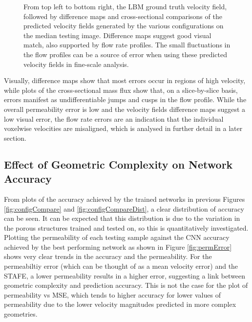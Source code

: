 \documentclass{article}
\begin{document}
\begin{figure}[htp!]
\begin{minipage}[b]{0.32\textwidth}
  \end{minipage}
  \vspace{5mm}
    \caption{From top left to bottom right, the LBM ground truth velocity field, followed by difference maps and cross-sectional comparisons of the predicted velocity fields generated by the various configurations on the median testing image. Difference maps suggest good visual match, also supported by flow rate profiles. The small fluctuations in the flow profiles can be a source of error when using these predicted velocity fields in fine-scale analysis.}
    \label{fig:velComparemedian}
\end{figure}

Visually, difference maps show that most errors occur in regions of high velocity, while plots of the cross-sectional mass flux show that, on a slice-by-slice basis, errors manifest as undifferentiable jumps and cusps in the flow profile. While the overall permeability error is low and the velocity fields difference maps suggest a low visual error, the flow rate errors are an indication that the individual voxelwise velocities are misaligned, which is analysed in further detail in a later section. 

\subsection{Effect of Geometric Complexity on Network Accuracy}
\label{sec:complexAccuracy}

From plots of the accuracy achieved by the trained networks in previous Figures \ref{fig:configCompare} and \ref{fig:configCompareDist}, a clear distribution of accuracy can be seen. It can be expected that this distribution is due to the variation in the porous structures trained and tested on, so this is quantitatively investigated. Plotting the permeability of each testing sample against the CNN accuracy achieved by the best performing network as shown in Figure \ref{fig:permError} shows very clear trends in the accuracy and the permeability. For the permeabiltiy error (which can be thought of as a mean velocity error) and the STAFE, a lower permeability results in a higher error, suggesting a link between geometric complexity and prediction accuracy. This is not the case for the plot of permeability vs MSE, which tends to higher accuracy for lower values of permeability due to the lower velocity magnitudes predicted in more complex geometries.
\end{document}
